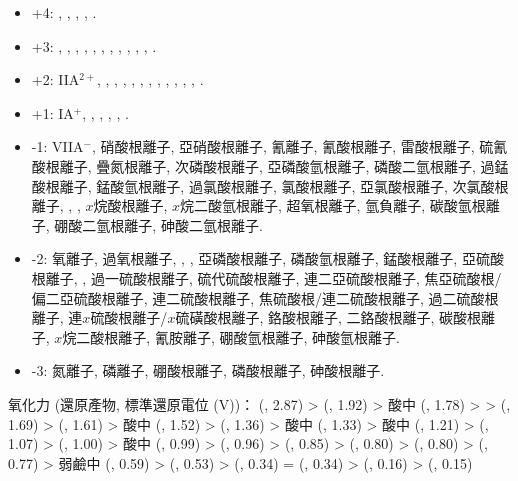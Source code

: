 \documentclass[a4paper,12pt]{report}
\begin{document}
\begin{itemize}
\item +4: , , , , .
\item +3: , , , , , , , , , , , .
\item +2: IIA$^{2+}$, , , , , , , , , , , , .
\item +1: IA$^+$, , , , , .
\item -1: VIIA$^-$, 硝酸根離子, 亞硝酸根離子, 氰離子, 氰酸根離子, 雷酸根離子, 硫氰酸根離子, 疊氮根離子, 次磷酸根離子, 亞磷酸氫根離子, 磷酸二氫根離子, 過錳酸根離子, 錳酸氫根離子, 過氯酸根離子, 氯酸根離子, 亞氯酸根離子, 次氯酸根離子, , , $x$烷酸根離子, $x$烷二酸氫根離子, 超氧根離子, 氫負離子, 碳酸氫根離子, 硼酸二氫根離子, 砷酸二氫根離子.
\item -2: 氧離子, 過氧根離子, , , 亞磷酸根離子, 磷酸氫根離子, 錳酸根離子, 亞硫酸根離子, , 過一硫酸根離子, 硫代硫酸根離子, 連二亞硫酸根離子, 焦亞硫酸根/偏二亞硫酸根離子, 連二硫酸根離子, 焦硫酸根/連二硫酸根離子, 過二硫酸根離子, 連$x$硫酸根離子/$x$硫磺酸根離子, 鉻酸根離子, 二鉻酸根離子, 碳酸根離子, $x$烷二酸根離子, 氰胺離子, 硼酸氫根離子, 砷酸氫根離子.
\item -3: 氮離子, 磷離子, 硼酸根離子, 磷酸根離子, 砷酸根離子.
\end{itemize}
氧化力 (還原產物, 標準還原電位 (V))： (, 2.87) >  (, 1.92) > 酸中  (, 1.78) > >  (, 1.69) >  (, 1.61) > 酸中  (, 1.52) >  (, 1.36) > 酸中  (, 1.33) > 酸中  (, 1.21) >  (, 1.07) >  (, 1.00) > 酸中  (, 0.99)  >  (, 0.96) >  (, 0.85) >  (, 0.80) >  (, 0.80) >  (, 0.77) > 弱鹼中  (, 0.59) >  (, 0.53) >  (, 0.34) =  (, 0.34) >  (, 0.16) >  (, 0.15)
\end{document}
